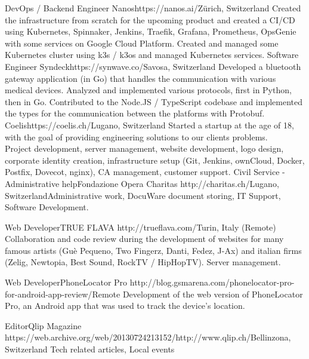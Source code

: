 \begin{CV}
        {DevOps / Backend Engineer}
        {Nanos}{https://nanos.ai/}{Zürich, Switzerland}
        {Created the infrastructure from scratch for the upcoming product 
        and created a CI/CD using Kubernetes, Spinnaker, Jenkins,
        Traefik, Grafana, Prometheus, OpsGenie with some services on
        Google Cloud Platform. Created and managed some Kubernetes cluster using 
        k3s / k3os and managed Kubernetes services.
      }
        {Software Engineer}
        {Syndeck}{https://synwave.co/}{Savosa, Switzerland}
        {Developed a bluetooth gateway application (in Go) that handles the communication with various
        medical devices. Analyzed and implemented various protocols, first in Python, then in Go.
        Contributed to the Node.JS / TypeScript codebase and implemented the types for the communication 
        between the platforms with Protobuf.}
        {Coelis}{https://coelis.ch/}{Lugano, Switzerland}
        {Started a startup at the age of 18, with the goal of providing engineering solutions to our clients problems.\\
        Project development, server management, website development, logo design, 
        corporate identity creation, infrastructure setup (Git, Jenkins, ownCloud, Docker, Postfix, Dovecot, nginx),
        CA management, customer support.}
    \pagebreak
    {Civil Service - Administrative help}{Fondazione Opera Charitas}
    {http://charitas.ch/}{Lugano, Switzerland}{Administrative work, DocuWare document storing, IT Support, Software Development.}

    {Web Developer}{TRUE FLAVA}
    {http://trueflava.com/}{Turin, Italy (Remote)}{
        Collaboration and code review during the development of websites for many famous artists (Guè Pequeno,
        Two Fingerz, Danti, Fedez, J-Ax) and italian firms (Zelig, Newtopia, Best Sound, RockTV / HipHopTV). 
        Server management.
    }

    {Web Developer}{PhoneLocator Pro}
    {http://blog.gsmarena.com/phonelocator-pro-for-android-app-review/}{Remote}
    {Development of the web version of PhoneLocator Pro, an Android app that was used 
    to track the device's location.}

    {Editor}{Qlip Magazine}
    {https://web.archive.org/web/20130724213152/http://www.qlip.ch/}{Bellinzona, Switzerland}
    {Tech related articles, Local events}
\end{CV}
